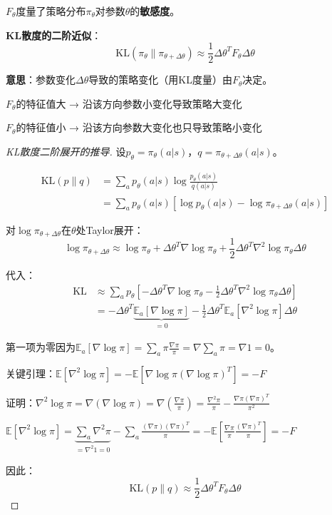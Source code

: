 \documentclass[11pt,a4paper]{article}
\theoremstyle{definition}
\begin{document}
\begin{keypoint}[Fisher信息的几何意义]
$F_\theta$度量了策略分布$\pi_\theta$对参数$\theta$的\textbf{敏感度}。

\textbf{KL散度的二阶近似}：
\[
\text{KL}(\pi_\theta \| \pi_{\theta + \Delta\theta}) \approx \frac{1}{2} \Delta\theta^T F_\theta \Delta\theta
\]

\textbf{意思}：参数变化$\Delta\theta$导致的策略变化（用KL度量）由$F_\theta$决定。

$F_\theta$的特征值大 → 沿该方向参数小变化导致策略大变化

$F_\theta$的特征值小 → 沿该方向参数大变化也只导致策略小变化
\end{keypoint}

\begin{proof}[KL散度二阶展开的推导]
设$p_\theta = \pi_\theta(a|s)$，$q = \pi_{\theta + \Delta\theta}(a|s)$。

\begin{align*}
\text{KL}(p \| q) &= \sum_a p_\theta(a|s) \log \frac{p_\theta(a|s)}{q(a|s)} \\
&= \sum_a p_\theta(a|s) [\log p_\theta(a|s) - \log \pi_{\theta+\Delta\theta}(a|s)]
\end{align*}

对$\log \pi_{\theta+\Delta\theta}$在$\theta$处Taylor展开：
\[
\log \pi_{\theta+\Delta\theta} \approx \log \pi_\theta + \Delta\theta^T \nabla \log \pi_\theta + \frac{1}{2} \Delta\theta^T \nabla^2 \log \pi_\theta \Delta\theta
\]

代入：
\begin{align*}
\text{KL} &\approx \sum_a p_\theta \left[-\Delta\theta^T \nabla \log \pi_\theta - \frac{1}{2}\Delta\theta^T \nabla^2 \log \pi_\theta \Delta\theta\right] \\
&= -\Delta\theta^T \underbrace{\mathbb{E}_a[\nabla \log \pi]}_{=0} - \frac{1}{2}\Delta\theta^T \mathbb{E}_a[\nabla^2 \log \pi] \Delta\theta
\end{align*}

第一项为零因为$\mathbb{E}_a[\nabla \log \pi] = \sum_a \pi \frac{\nabla \pi}{\pi} = \nabla \sum_a \pi = \nabla 1 = 0$。

关键引理：$\mathbb{E}[\nabla^2 \log \pi] = -\mathbb{E}[\nabla \log \pi (\nabla \log \pi)^T] = -F$

证明：$\nabla^2 \log \pi = \nabla(\nabla \log \pi) = \nabla\left(\frac{\nabla \pi}{\pi}\right) = \frac{\nabla^2 \pi}{\pi} - \frac{\nabla \pi (\nabla \pi)^T}{\pi^2}$

$\mathbb{E}[\nabla^2 \log \pi] = \underbrace{\sum_a \nabla^2 \pi}_{=\nabla^2 1 = 0} - \sum_a \frac{(\nabla \pi)(\nabla \pi)^T}{\pi} = -\mathbb{E}\left[\frac{\nabla \pi}{\pi}\frac{(\nabla \pi)^T}{\pi}\right] = -F$

因此：
\[
\text{KL}(p \| q) \approx \frac{1}{2} \Delta\theta^T F_\theta \Delta\theta
\]
\end{proof}
\end{document}
